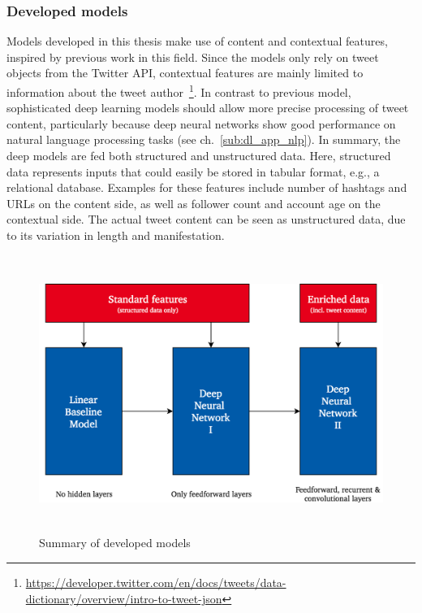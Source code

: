 \subsubsection{Developed models}

Models developed in this thesis make use of content and contextual features,
inspired by previous work in this field.
Since the models only rely on tweet objects from the Twitter API, contextual
features are mainly limited to information about the tweet author~\footnote{\url{https://developer.twitter.com/en/docs/tweets/data-dictionary/overview/intro-to-tweet-json}}.
In contrast to previous model, sophisticated deep learning models should allow
more precise processing of tweet content, particularly because deep neural networks
show good performance on natural language processing tasks (see ch.~\ref{sub:dl_app_nlp}).
In summary, the deep models are fed both structured and unstructured data.
Here, structured data represents inputs that could easily be stored in
tabular format, e.g., a relational database.
Examples for these features include number of hashtags and URLs on the content
side, as well as follower count and account age on the contextual side.
The actual tweet content can be seen as unstructured data, due to its variation
in length and manifestation.

\begin{figure}[h]
  \includegraphics[height=9cm]{img/model_summary}
  \caption{Summary of developed models}
\label{fig:model_summary}
\end{figure}


